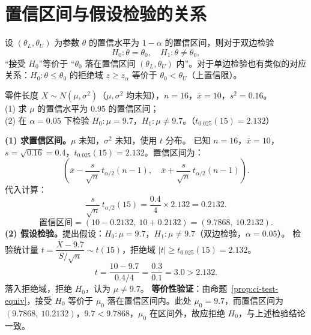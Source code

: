 \documentclass[lang=cn,11pt]{elegantbook}
\begin{document}
\section{置信区间与假设检验的关系} \label{sec:ht-ci}

\begin{property}[置信区间与假设检验的等价性]\label{prop:ci-test-equiv}
设 \((\theta_L, \theta_U)\) 为参数 \(\theta\) 的置信水平为 \(1-\alpha\) 的置信区间，则对于双边检验
\[
H_0\colon \theta=\theta_0,\quad H_1\colon \theta\neq\theta_0,
\]
“接受 \(H_0\)”等价于 “\(\theta_0\) 落在置信区间 \((\theta_L, \theta_U)\) 内”。对于单边检验也有类似的对应关系：\(H_0\colon \theta\leq\theta_0\) 的拒绝域 \(z\geq z_\alpha\) 等价于 \(\theta_0 < \theta_U\)（上置信限）。
\end{property}

\begin{exercise}\label{exer:9-ci-test}
零件长度 \(X \sim N(\mu, \sigma^2)\)（\(\mu, \sigma^2\) 均未知），\(n=16\)，\(\overline{x}=10\)，\(s^2=0.16\)。\\
(1) 求 \(\mu\) 的置信水平为 0.95 的置信区间；\\
(2) 在 \(\alpha=0.05\) 下检验 \(H_0\colon \mu=9.7\)，\(H_1\colon \mu\neq9.7\)。（\(t_{0.025}(15)=2.132\)）
\end{exercise}
\begin{solution}
\textbf{(1) 求置信区间。}\(\mu\) 未知，\(\sigma^2\) 未知，使用 \(t\) 分布。
已知 \(n=16\)，\(\overline{x}=10\)，\(s=\sqrt{0.16}=0.4\)，\(t_{0.025}(15)=2.132\)。置信区间为：
\[
\left(\overline{x} - \frac{s}{\sqrt{n}}\,t_{\alpha/2}(n{-}1),\quad \overline{x} + \frac{s}{\sqrt{n}}\,t_{\alpha/2}(n{-}1)\right).
\]
代入计算：
\[
\frac{s}{\sqrt{n}}\,t_{\alpha/2}(15) = \frac{0.4}{4}\times2.132 = 0.2132.
\]
\[
\text{置信区间} = (10-0.2132,\ 10+0.2132) = (9.7868,\ 10.2132).
\]
\textbf{(2) 假设检验。}提出假设：\(H_0\colon \mu=9.7\)，\(H_1\colon \mu\neq9.7\)（双边检验，\(\alpha=0.05\)）。
检验统计量 \(t = \dfrac{\overline{X}-9.7}{S/\sqrt{n}} \sim t(15)\)，拒绝域 \(|t| \geq t_{0.025}(15)=2.132\)。
\[
t = \frac{10-9.7}{0.4/4} = \frac{0.3}{0.1} = 3.0 > 2.132.
\]
落入拒绝域，拒绝 \(H_0\)，认为 \(\mu\neq9.7\)。
\textbf{等价性验证}：由命题~\ref{prop:ci-test-equiv}，接受 \(H_0\) 等价于 \(\mu_0\) 落在置信区间内。此处 \(\mu_0=9.7\)，而置信区间为 \((9.7868,\ 10.2132)\)，\(9.7 < 9.7868\)，\(\mu_0\) 在区间外，故应拒绝 \(H_0\)，与上述检验结论一致。
\end{solution}
\end{document}
